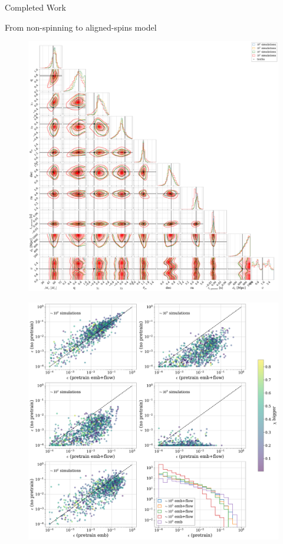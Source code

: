 \documentclass[a4paper, 12pt, twoside, openright, titlepage]{book}
\begin{document}
\begin{chapter}{Completed Work}
\begin{section}{From non-spinning to aligned-spins model}
\begin{figure}
\includegraphics[width=1.1\columnwidth]{figures/cornerplots.pdf}
\caption{}
\label{cp}
\end{figure}

\begin{figure}
\includegraphics[width=1.1\columnwidth]{figures/neff.pdf}
\caption{}
\label{eff}
\end{figure}







\end{section}



\end{chapter}
\end{document}
